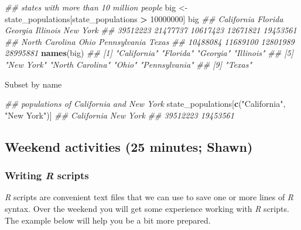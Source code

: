 \documentclass[
]{book}
\newenvironment{Shaded}{\begin{snugshade}}{\end{snugshade}}
\newcommand{\CommentTok}[1]{\textcolor[rgb]{0.56,0.35,0.01}{\textit{#1}}}
\newcommand{\DecValTok}[1]{\textcolor[rgb]{0.00,0.00,0.81}{#1}}
\newcommand{\KeywordTok}[1]{\textcolor[rgb]{0.13,0.29,0.53}{\textbf{#1}}}
\newcommand{\NormalTok}[1]{#1}
\newcommand{\OperatorTok}[1]{\textcolor[rgb]{0.81,0.36,0.00}{\textbf{#1}}}
\newcommand{\StringTok}[1]{\textcolor[rgb]{0.31,0.60,0.02}{#1}}
\begin{document}
\begin{itemize}
\begin{Shaded}
\begin{Highlighting}[]
\CommentTok{## states with more than 10 million people}
\NormalTok{big <-}\StringTok{ }\NormalTok{state_populations[state_populations }\OperatorTok{>}\StringTok{ }\DecValTok{10000000}\NormalTok{]}
\NormalTok{big}
\CommentTok{##     California        Florida        Georgia       Illinois       New York }
\CommentTok{##       39512223       21477737       10617423       12671821       19453561 }
\CommentTok{## North Carolina           Ohio   Pennsylvania          Texas }
\CommentTok{##       10488084       11689100       12801989       28995881}
\KeywordTok{names}\NormalTok{(big)}
\CommentTok{## [1] "California"     "Florida"        "Georgia"        "Illinois"      }
\CommentTok{## [5] "New York"       "North Carolina" "Ohio"           "Pennsylvania"  }
\CommentTok{## [9] "Texas"}
\end{Highlighting}
\end{Shaded}

  Subset by name

\begin{Shaded}
\begin{Highlighting}[]
\CommentTok{## populations of California and New York}
\NormalTok{state_populations[}\KeywordTok{c}\NormalTok{(}\StringTok{"California"}\NormalTok{, }\StringTok{"New York"}\NormalTok{)]}
\CommentTok{## California   New York }
\CommentTok{##   39512223   19453561}
\end{Highlighting}
\end{Shaded}
\end{itemize}

\hypertarget{weekend-activities-25-minutes-shawn}{%
\subsection{Weekend activities (25 minutes; Shawn)}\label{weekend-activities-25-minutes-shawn}}

\hypertarget{writing-r-scripts}{%
\subsubsection*{\texorpdfstring{Writing \emph{R} scripts}{Writing R scripts}}\label{writing-r-scripts}}

\emph{R} scripts are convenient text files that we can use to save one or more lines of \emph{R} syntax. Over the weekend you will get some experience working with \emph{R} scripts. The example below will help you be a bit more prepared.
\end{document}
